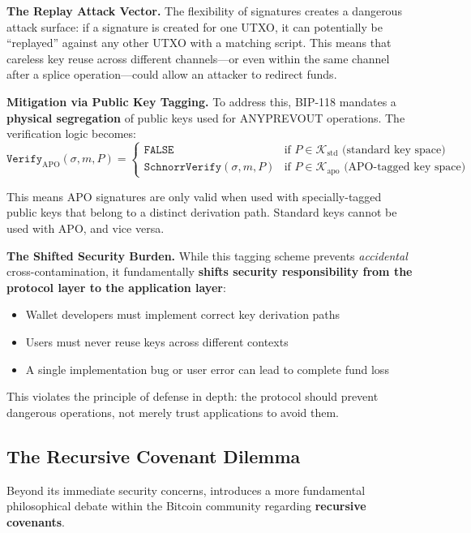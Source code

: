 \textbf{The Replay Attack Vector.} The flexibility of  signatures creates a dangerous attack surface: if a signature is created for one UTXO, it can potentially be ``replayed'' against any other UTXO with a matching script. This means that careless key reuse across different channels---or even within the same channel after a splice operation---could allow an attacker to redirect funds.

\textbf{Mitigation via Public Key Tagging.} To address this, BIP-118 mandates a \textbf{physical segregation} of public keys used for ANYPREVOUT operations. The verification logic becomes:
$$
\texttt{Verify}_{\mathrm{APO}}(\sigma, m, P) =
\begin{cases}
\texttt{FALSE} & \text{if } P \in \mathcal{K}_{\mathrm{std}} \text{ (standard key space)} \\
\texttt{SchnorrVerify}(\sigma, m, P) & \text{if } P \in \mathcal{K}_{\mathrm{apo}} \text{ (APO-tagged key space)}
\end{cases}
$$

This means APO signatures are only valid when used with specially-tagged public keys that belong to a distinct derivation path. Standard keys cannot be used with APO, and vice versa.

\textbf{The Shifted Security Burden.} While this tagging scheme prevents \textit{accidental} cross-contamination, it fundamentally \textbf{shifts security responsibility from the protocol layer to the application layer}:
\begin{itemize}
    \item Wallet developers must implement correct key derivation paths
    \item Users must never reuse keys across different contexts
    \item A single implementation bug or user error can lead to complete fund loss
\end{itemize}

This violates the principle of defense in depth: the protocol should prevent dangerous operations, not merely trust applications to avoid them.

\subsection{The Recursive Covenant Dilemma}

Beyond its immediate security concerns,  introduces a more fundamental philosophical debate within the Bitcoin community regarding \textbf{recursive covenants}.

